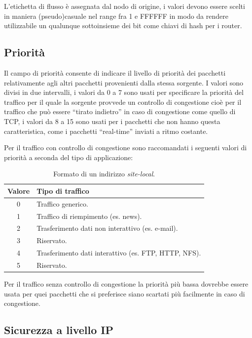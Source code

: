 L'etichetta di flusso è assegnata dal nodo di origine, i valori devono
essere scelti in maniera (pseudo)casuale nel range fra 1 e FFFFFF in modo da
rendere utilizzabile un qualunque sottoinsieme dei bit come chiavi di hash per
i router.

\subsection{Priorità}
\label{sec:IPv6_prio}

Il campo di priorità consente di indicare il livello di priorità dei
pacchetti relativamente agli altri pacchetti provenienti dalla stessa
sorgente. I valori sono divisi in due intervalli, i valori da 0 a 7 sono usati
per specificare la priorità del traffico per il quale la sorgente provvede
un controllo di congestione cioè per il traffico che può essere ``tirato
indietro'' in caso di congestione come quello di TCP, i valori da 8 a 15 sono
usati per i pacchetti che non hanno questa caratteristica, come i pacchetti
``real-time'' inviati a ritmo costante.

Per il traffico con controllo di congestione sono raccomandati i seguenti
valori di priorità a seconda del tipo di applicazione:

\begin{table}[htb]
  \centering
  \footnotesize
  \begin{tabular}{|c|l|}
    \hline
    \textbf{Valore} & \textbf{Tipo di traffico} \\
    \hline
    \hline
    0 & Traffico generico.\\
    1 & Traffico di riempimento (es. news).\\
    2 & Trasferimento dati non interattivo (es. e-mail).\\
    3 & Riservato.\\
    4 & Trasferimento dati interattivo (es. FTP, HTTP, NFS).\\
    5 & Riservato.\\
    \hline
\end{tabular}
\caption{Formato di un indirizzo \textit{site-local}.}
\label{tab:priority}
\end{table}

Per il traffico senza controllo di congestione la priorità più bassa
dovrebbe essere usata per quei pacchetti che si preferisce siano scartati
più facilmente in caso di congestione.


\subsection{Sicurezza a livello IP}
\label{sec:security}


